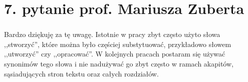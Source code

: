 \section*{7. pytanie prof. Mariusza Zuberta}
\begin{frame}
\frametitle{\secname}
\framesubtitle{\fontsize{5.6}{1}\selectfont{W pracy wielokrotnie występuje słowo ,,stworzyć''. W chwili obecnej odstępuje się od starych związków frazeologicznych tego słowa na rzecz bezpośredniego tłumaczenia angielskiego słowa ,,create''. Chciałbym jednak zasugerować przynajmniej próbę zastosowanie innego określenia w części wystąpień tego słowa. }}


Bardzo dziękuję za tę uwagę. Istotnie w pracy zbyt często użyto słowa ,,stworzyć'', które można było częściej substytuować, przykładowo słowem ,,utworzyć'' czy ,,opracować''. W kolejnych pracach postaram się używać synonimów  tego słowa i nie nadużywać go zbyt często w ramach akapitów, sąsiadujących stron tekstu oraz całych rozdziałów.
\end{frame}